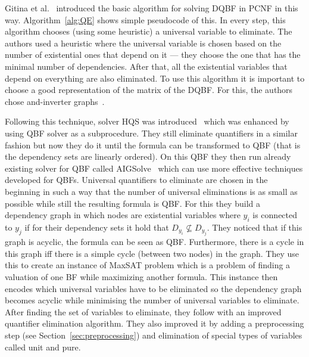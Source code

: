 \documentclass[
  digital, %
  color,
  twoside, %
  table,   %
  nolof,     %
  nolot,     %
]{fithesis3}
\theoremstyle{definition}
\theoremstyle{remark}
\begin{document}
Gitina et al.~\cite{HQSsimpleAlg} introduced the basic algorithm for solving DQBF in PCNF in this way. Algorithm~\ref{alg:QE} shows simple pseudocode of this. In every step, this algorithm chooses (using some heuristic) a universal variable to eliminate. The authors used a heuristic where the universal variable is chosen based on the number of existential ones that depend on it --- they choose the one that has the minimal number of dependencies. After that, all the existential variables that depend on everything are also eliminated. To use this algorithm it is important to choose a good representation of the matrix of the DQBF. For this, the authors chose and-inverter graphs~\cite{FRAIGs}. %

Following this technique, solver HQS was introduced~\cite{HQSquantifierElimination} which was enhanced by using QBF solver as a subprocedure. They still eliminate quantifiers in a similar fashion but now they do it until the formula can be transformed to QBF (that is the dependency sets are linearly ordered). On this QBF they then run already existing solver for QBF called AIGSolve~\cite{AIGSolve} which can use more effective techniques developed for QBFs. Universal quantifiers to eliminate are chosen in the beginning in such a way that the number of universal eliminations is as small as possible while still the resulting formula is QBF. For this they build a dependency graph in which nodes are existential variables where $y_i$ is connected to $y_j$ if for their dependency sets it hold that $D_{y_i} \not\subseteq D_{y_j}$. They noticed that if this graph is acyclic, the formula can be seen as QBF. Furthermore, there is a cycle in this graph iff there is a simple cycle (between two nodes) in the graph. They use this to create an instance of MaxSAT problem which is a problem of finding a valuation of one BF while maximizing another formula. This instance then encodes which universal variables have to be eliminated so the dependency graph becomes acyclic while minimising the number of universal variables to eliminate. After finding the set of variables to eliminate, they follow with an improved quantifier elimination algorithm. They also improved it by adding a preprocessing step (see Section~\ref{sec:preprocessing}) and elimination of special types of variables called unit and pure. 
\end{document}
